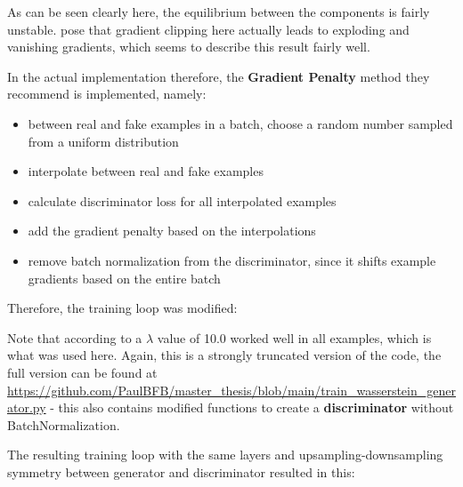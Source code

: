 
As can be seen clearly here, the equilibrium between the components is fairly unstable.
\cite{gulrajani2017improved} pose that gradient clipping here actually leads to exploding and vanishing gradients, which seems to describe this result fairly well. 

In the actual implementation therefore, the \textbf{Gradient Penalty} method they recommend is implemented, namely:

\begin{itemize}
	\item between real and fake examples in a batch, choose a random number sampled from a uniform distribution
	\item interpolate between real and fake examples
	\item calculate discriminator loss for all interpolated examples
	\item add the gradient penalty based on the interpolations
	\item remove batch normalization from the discriminator, since it shifts example gradients based on the entire batch
\end{itemize}

\pagebreak

Therefore, the training loop was modified:



Note that according to \cite{gulrajani2017improved} a $\lambda$ value of 10.0 worked well in all examples, which is what was used here. Again, this is a strongly truncated version of the code, the full version can be found at \url{https://github.com/PaulBFB/master_thesis/blob/main/train_wasserstein_generator.py} - this also contains modified functions to create a \textbf{discriminator} without BatchNormalization.

The resulting training loop with the same layers and upsampling-downsampling symmetry between generator and discriminator resulted in this:


